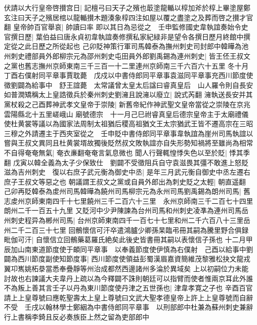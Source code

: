 伏請以大行皇帝啓攅宫日|{
	記檀弓曰天子之殯也菆塗龍輴以椁加斧於椁上畢塗屋鄭玄注曰天子之殯居棺以龍輴攅木題湊象椁四注如屋以覆之盡塗之及葬而啓之攅才官翻}
皇帝帥百官舉哀|{
	帥讀曰率}
即以其日為忌從之　壬申監修國史韋執誼奏始令史官撰日歷|{
	葉伯益曰唐永貞初韋執誼奏修撰私家紀緑非是望令各撰日歷月終館中撰定從之此日歷之所從起也}
己卯貶神策行軍司馬韓泰為撫州刺史司封郎中韓曄為池州刺史禮部員外郎柳宗元為邵州刺史屯田員外郎劉禹錫為連州刺史|{
	皆王伾王叔文之黨也舊志撫州京師東南三千三百一十二里連州京師南三千六百六十五里}
冬十月丁酉右僕射同平章事賈耽薨　戊戍以中書侍郎同平章事袁滋同平章事充西川節度使徵劉闢為給事中　舒王誼薨　太常議曾太皇太后諡曰睿真皇后　山人羅令則自長安如普潤矯稱太上皇誥徵兵於秦州刺史劉澭且說澭以廢立|{
	說式芮翻}
澭執送長安并其黨杖殺之己酉葬神武孝文皇帝于崇陵|{
	新舊帝紀作神武聖文皇帝當從之崇陵在京兆雲陽縣北十五里嵯峨山}
廟號德宗　十一月己巳祔睿真皇后德宗皇帝主于太廟禮儀使杜黄裳等議以為國家法周制太祖猶后稷高祖猶文王太宗猶武王皆不遷高宗在三昭三穆之外請遷主于西夾室從之　壬申貶中書侍郎同平章事韋執誼為崖州司馬執誼以嘗與王叔文異同且杜黄裳壻故獨後貶然叔文敗執誼亦自失形勢知禍將至雖尚為相常不自得奄奄無氣|{
	奄衣亷翻奄奄言氣息微也}
聞人行聲輒惶悸失色以至於貶|{
	悸其季翻}
戊寅以韓全義為太子少保致仕　劉闢不受徵阻兵自守袁滋畏其彊不敢進上怒貶滋為吉州刺史　復以右庶子武元衡為御史中丞|{
	是年三月武元衡自御史中丞左遷右庶子王叔文等惡之也}
朝議謂王叔文之黨或自員外郎出為刺史貶之太輕|{
	朝直遥翻}
己卯再貶韓泰為䖍州司馬韓曄為饒州司馬柳宗元為永州司馬劉禹錫為朗州司馬|{
	舊志䖍州京師東南四千十七里饒州三千二百六十三里　永州京師南三千二百七十四里朗州二千一百五十九里}
又貶河中少尹陳諫為台州司馬和州刺史凌凖為連州司馬岳州刺史程异為郴州司馬|{
	台州京師東南四千一百七十七里和州二千六百八十三里岳州二千二百三十七里}
回鶻懷信可汗卒遣鴻臚少卿孫杲臨弔冊其嗣為騰里野合俱録毗伽可汗|{
	自懷信立回鶻藥葛羅氏絶矣此後史皆書冊其嗣以表懷信子孫也}
十二月甲辰加山南東道節度使于頔同平章事　以奉義節度使伊慎為右僕射　己酉以給事中劉闢為西川節度副使知節度事|{
	西川節度使領益彭蜀漢眉嘉資簡維茂黎雅松抉文龍戎翼卭嶲姚柘㳟當悉奉疊靜等州治成都然西邊諸州多淪於異域矣}
上以初嗣位力未能討故也右諫議大夫韋丹上疏以為今釋闢不誅則朝廷可以指臂而使者惟兩京耳此外誰不為叛上善其言壬子以丹為東川節度使丹津之五世孫也|{
	津韋孝寛之子也}
辛酉百官請上上皇尊號曰應乾聖壽太上皇上尊號曰文武大聖孝德皇帝上許上上皇尊號而自辭不受　壬戌以翰林學士鄭絪為中書侍郎同平章事　以刑部郎中杜兼為蘇州刺史兼辭行上書稱李錡且反必奏族臣上然之留為吏部郎中

